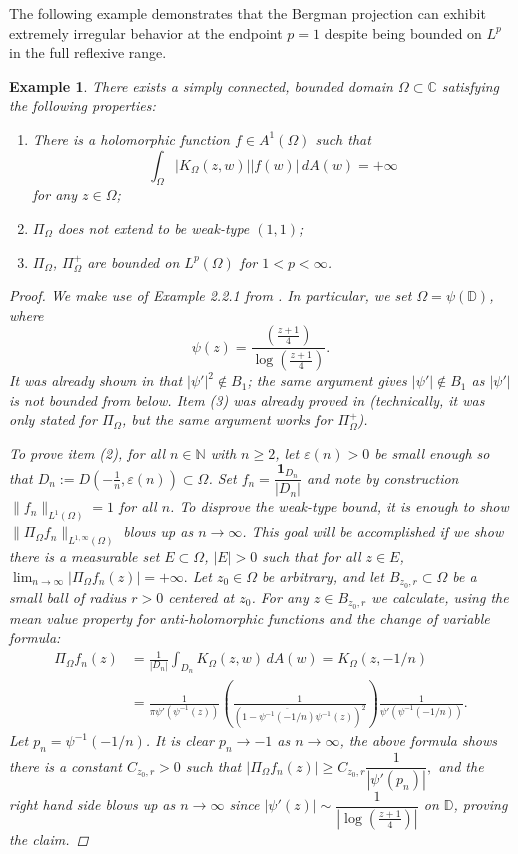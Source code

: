 \documentclass{amsart}
\newtheorem{example}[theorem]{Example}
\theoremstyle{definition}
\numberwithin{equation}{section}
\begin{document}
The following example demonstrates that the Bergman projection can exhibit extremely irregular behavior at the endpoint $p=1$ despite being bounded on $L^p$ in the full reflexive range.

\begin{example}
There exists a simply connected, bounded domain $\Omega \subset \mathbb{C}$ satisfying the following properties:
\begin{enumerate}
    \item There is a holomorphic function $f \in A^1(\Omega)$ such that 
    $$ \int_{\Omega} |K_{\Omega}(z,w)||f(w)|\, dA(w)=+\infty$$ for any $z \in \Omega$;
    \item $\Pi_{\Omega}$ does not extend to be weak-type $(1,1)$;
    \item $\Pi_{\Omega}$, $\Pi_{\Omega}^{+}$ are bounded on $L^p(\Omega)$ for $1<p<\infty$.
\end{enumerate}

\begin{proof}
We make use of Example 2.2.1 from \cite{GW24}. In particular, we set $\Omega= \psi(\mathbb{D})$, where
$$ \psi(z)= \frac{( \frac{z+1}{4})}{\log( \frac{z+1}{4})}.$$ It was already shown in \cite{GW24} that $|\psi'|^2 \notin B_1$; the same argument gives $|\psi'| \notin B_1$ as $|\psi'|$ is not bounded from below.
Item (3) was already proved in \cite{GW24} (technically, it was only stated for $\Pi_{\Omega}$, but the same argument works for $\Pi_{\Omega}^{+}$).

To prove item (2), for all $n \in \mathbb{N}$ with $n \geq 2$, let $\varepsilon(n)>0$ be small enough so that $D_n:=D(-\frac{1}{n}, \varepsilon(n)) \subset \Omega$. Set $f_n= \dfrac{\mathbf{1}_{D_n}}{|D_n|}$ and note by construction $\|f_n\|_{L^1(\Omega)}=1$ for all $n$. To disprove the weak-type bound, it is enough to show $\|\Pi_\Omega f_n\|_{L^{1,\infty}(\Omega)}$ blows up as $n \rightarrow \infty$. This goal will be accomplished if we show there is a measurable set $E \subset \Omega$, $|E|>0$ such that for all $z \in E$, $\lim_{n \rightarrow \infty} |\Pi_\Omega f_n(z)|=+\infty.$ Let $z_0 \in \Omega$ be arbitrary, and let $B_{z_0,r} \subset \Omega$ be a small ball of radius $r>0$ centered at $z_0$. For any $z \in B_{z_0,r}$ we calculate, using the mean value property for anti-holomorphic functions and the change of variable formula:
\begin{align*}
\Pi_{\Omega}f_n(z) & = \frac{1}{|D_n|}\int_{D_n}K_{\Omega}(z,w) \, dA(w) = K_{\Omega}(z,-1/n) \\  
&= \frac{1}{\pi \psi'(\psi^{-1}(z))} \left(\frac{1}{(1-\overline{\psi^{-1}(-1/n)} \psi^{-1}(z))^2}\right) \frac{1}{ \psi'(\psi^{-1}(-1/n))}.\end{align*}
Let $p_n= \psi^{-1}(-1/n)$. It is clear $p_n \rightarrow -1$ as $n \rightarrow \infty$, the above formula shows there is a constant $C_{z_0,r}>0$ such that 
 $|\Pi_{\Omega}f_n(z)| \geq C_{z_0,r} \dfrac{1}{|\psi'(p_n)|},$
and the right hand side blows up as $n \rightarrow \infty$ since $|\psi'(z)| \sim \dfrac{1}{\left \lvert \log(\frac{z+1}{4} )\right \rvert} $ on $\mathbb{D}$, proving the claim. 


\end{proof}
\end{example}
\end{document}
